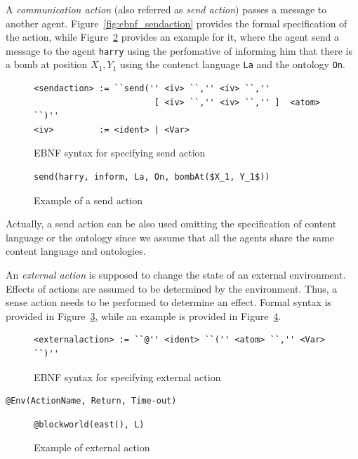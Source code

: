 \documentclass[a4paper]{article}
\begin{document}
A \emph{communication action} (also referred as \emph{send action}) passes a message to another agent. Figure~\ref{fig:ebnf_sendaction} provides the formal specification of the action, while Figure~\ref{fig:example_sendaction} provides an example for it, where the agent send a message to the agent \texttt{harry} using the perfomative of informing him that there is a bomb at position $X_1, Y_1$ using the contenct language \texttt{La} and the ontology \texttt{On}.

\begin{figure}[htp]
\begin{verbatim}
<sendaction> := ``send('' <iv> ``,'' <iv> ``,''
                        [ <iv> ``,'' <iv> ``,'' ]  <atom> ``)''  
<iv>         := <ident> | <Var>
\end{verbatim}
\caption{EBNF syntax for specifying send action}
\label{fig:ebnf_beliefupdate}
\end{figure}

\begin{figure}[htp]
\begin{verbatim}
send(harry, inform, La, On, bombAt($X_1, Y_1$))
\end{verbatim}
\caption{Example of a send action}
\label{fig:example_sendaction}
\end{figure}

Actually, a send action can be also used omitting the specification of content language or the ontology since we assume that all the agents share the same content language and ontologies.

An \emph{external action} is supposed to change the state of an external environment. Effects of actions are assumed to be determined by the environment. Thus, a sense action needs to be performed to determine an effect. Formal syntax is provided in Figure~\ref{fig:ebnf_extaction}, while an example is provided in Figure~\ref{fig:example_extaction}.

\begin{figure}[htp]
\begin{verbatim}
<externalaction> := ``@'' <ident> ``('' <atom> ``,'' <Var> ``)''
\end{verbatim}
\caption{EBNF syntax for specifying external action}
\label{fig:ebnf_extaction}
\end{figure}

\begin{verbatim}
@Env(ActionName, Return, Time-out)
\end{verbatim}

\begin{figure}[htp]
\begin{verbatim}
@blockworld(east(), L)
\end{verbatim}
\caption{Example of external action}
\label{fig:example_extaction}
\end{figure}
\end{document}
